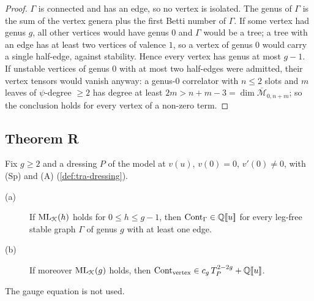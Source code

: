 \begin{proof}
$\Gamma$ is connected and has an edge, so no vertex is isolated. The genus of $\Gamma$ is the sum of the vertex genera plus the first Betti number of $\Gamma$. If some vertex had genus $g$, all other vertices would have genus $0$ and $\Gamma$ would be a tree; a tree with an edge has at least two vertices of valence $1$, so a vertex of genus $0$ would carry a single half-edge, against stability. Hence every vertex has genus at most $g-1$. If unstable vertices of genus $0$ with at most two half-edges were admitted, their vertex tensors would vanish anyway: a genus-$0$ correlator with $n\leq 2$ slots and $m$ leaves of $\psi$-degree $\geq 2$ has degree at least $2m>n+m-3 = \dim\overline{\mathcal M}_{0,n+m}$; so the conclusion holds for every vertex of a non-zero term.
\end{proof}

\subsection{Theorem R}
\label{sec:red-thm}

\begin{thm}[Theorem R]
\label{thm:red-main}
Fix $g\geq 2$ and a dressing $P$ of the model at $v(u)$, $v(0) = 0$, $v'(0)\neq 0$, with (Sp) and (A) (\cref{def:tra-dressing}).
\begin{description}
\item[(a)] If $\mathrm{ML}_{\mathcal{K}}(h)$ holds for $0\leq h\leq g-1$, then $\mathrm{Cont}_\Gamma\in\mathbb{Q}[\![ u ]\!]$ for every leg-free stable graph $\Gamma$ of genus $g$ with at least one edge.
\item[(b)] If moreover $\mathrm{ML}_{\mathcal{K}}(g)$ holds, then $\mathrm{Cont}_{\mathrm{vertex}}\in c_g\,T_P^{2-2g}+\mathbb{Q}[\![ u ]\!]$.
\end{description}
The gauge equation is not used.
\end{thm}

